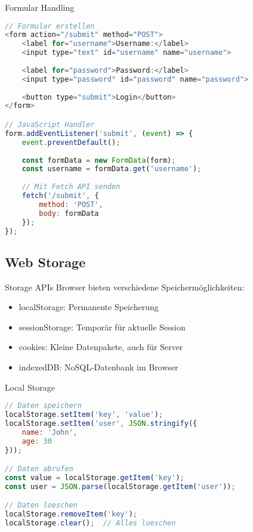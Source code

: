 \begin{KR}{Formular Handling}
\begin{lstlisting}[language=JavaScript, style=basesmol]
// Formular erstellen
<form action="/submit" method="POST">
    <label for="username">Username:</label>
    <input type="text" id="username" name="username">
    
    <label for="password">Password:</label>
    <input type="password" id="password" name="password">
    
    <button type="submit">Login</button>
</form>

// JavaScript Handler
form.addEventListener('submit', (event) => {
    event.preventDefault();
    
    const formData = new FormData(form);
    const username = formData.get('username');
    
    // Mit Fetch API senden
    fetch('/submit', {
        method: 'POST',
        body: formData
    });
});
\end{lstlisting}
\end{KR}

\subsection{Web Storage}

\begin{concept}{Storage APIs}
    Browser bieten verschiedene Speichermöglichkeiten:
    \begin{itemize}
        \item localStorage: Permanente Speicherung
        \item sessionStorage: Temporär für aktuelle Session
        \item cookies: Kleine Datenpakete, auch für Server
        \item indexedDB: NoSQL-Datenbank im Browser
    \end{itemize}
\end{concept}

\begin{KR}{Local Storage}
\begin{lstlisting}[language=JavaScript, style=basesmol]
// Daten speichern
localStorage.setItem('key', 'value');
localStorage.setItem('user', JSON.stringify({
    name: 'John',
    age: 30
}));

// Daten abrufen
const value = localStorage.getItem('key');
const user = JSON.parse(localStorage.getItem('user'));

// Daten loeschen
localStorage.removeItem('key');
localStorage.clear();  // Alles loeschen
\end{lstlisting}
\end{KR}

